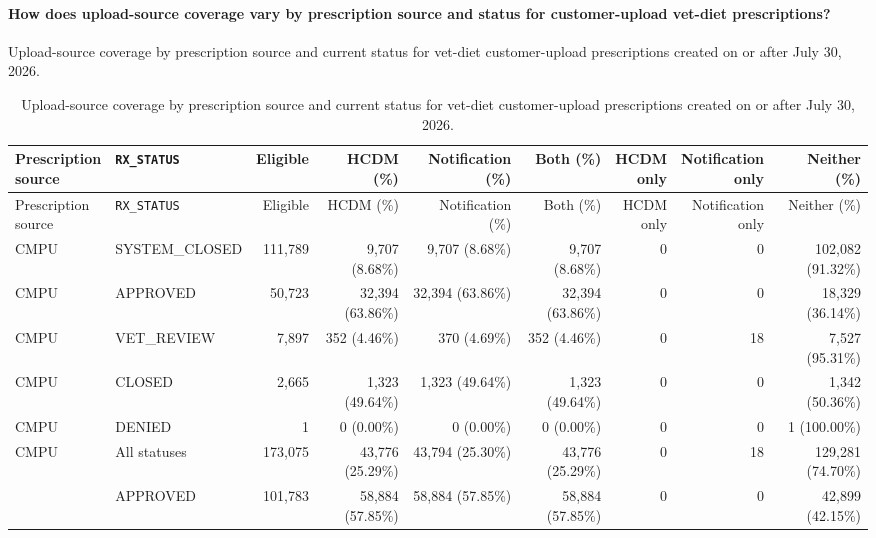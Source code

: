\paragraph{How does upload-source coverage vary by prescription source and status for customer-upload vet-diet prescriptions?}
Upload-source coverage by prescription source and current status for vet-diet customer-upload prescriptions created on or after July 30, 2026.

\begin{longtable}{@{}llrrrrrrr@{}}
\caption{Upload-source coverage by prescription source and current status for vet-diet customer-upload prescriptions created on or after July 30, 2026.}
\label{tab:cmpu-approved-prescription-upload-coverage}\\
\toprule \shortstack[l]{Prescription\\source} & \texttt{RX\_STATUS} & Eligible & HCDM (\%) & Notification (\%) & Both (\%) & \shortstack{HCDM\\only} & \shortstack{Notification\\only} & Neither (\%) \\
\midrule
\endfirsthead
\toprule \shortstack[l]{Prescription\\source} & \texttt{RX\_STATUS} & Eligible & HCDM (\%) & Notification (\%) & Both (\%) & \shortstack{HCDM\\only} & \shortstack{Notification\\only} & Neither (\%) \\
\midrule
\endhead

{CMPU} & {SYSTEM\_CLOSED} & 111,789 & 9,707 (8.68\%) & 9,707 (8.68\%) & 9,707 (8.68\%) & 0 & 0 & 102,082 (91.32\%) \\

{CMPU} & {APPROVED} & 50,723 & 32,394 (63.86\%) & 32,394 (63.86\%) & 32,394 (63.86\%) & 0 & 0 & 18,329 (36.14\%) \\

{CMPU} & {VET\_REVIEW} & 7,897 & 352 (4.46\%) & 370 (4.69\%) & 352 (4.46\%) & 0 & 18 & 7,527 (95.31\%) \\

{CMPU} & {CLOSED} & 2,665 & 1,323 (49.64\%) & 1,323 (49.64\%) & 1,323 (49.64\%) & 0 & 0 & 1,342 (50.36\%) \\

{CMPU} & {DENIED} & 1 & 0 (0.00\%) & 0 (0.00\%) & 0 (0.00\%) & 0 & 0 & 1 (100.00\%) \\
\midrule
{CMPU} & {All statuses} & 173,075 & 43,776 (25.29\%) & 43,794 (25.30\%) & 43,776 (25.29\%) & 0 & 18 & 129,281 (74.70\%) \\
\addlinespace[2pt]
{CUSTOMER\_UPLOAD} & {APPROVED} & 101,783 & 58,884 (57.85\%) & 58,884 (57.85\%) & 58,884 (57.85\%) & 0 & 0 & 42,899 (42.15\%) \\


\end{longtable}
